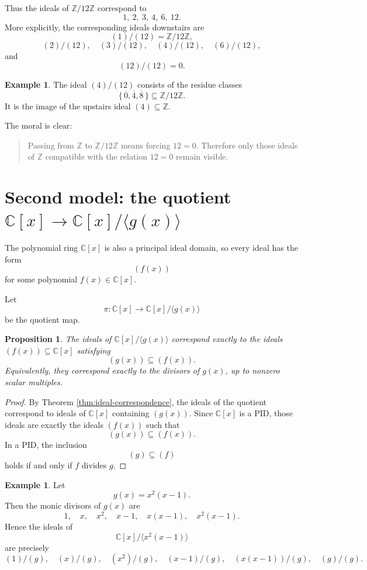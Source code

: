 \documentclass[11pt]{article}
\newtheorem{proposition}[theorem]{Proposition}
\theoremstyle{definition}
\newtheorem{example}[theorem]{Example}
\newcommand{\Z}{\mathbb{Z}}
\newcommand{\C}{\mathbb{C}}
\newcommand{\ideal}[1]{\langle #1\rangle}
\newcommand{\ol}[1]{\overline{#1}}
\begin{document}
	Thus the ideals of $\Z/12\Z$ correspond to
	\[
	1,\ 2,\ 3,\ 4,\ 6,\ 12.
	\]
	More explicitly, the corresponding ideals downstairs are
	\[
	(1)/(12)=\Z/12\Z,
	\]
	\[
	(2)/(12),\quad (3)/(12),\quad (4)/(12),\quad (6)/(12),
	\]
	and
	\[
	(12)/(12)=0.
	\]
	
	\begin{example}
		The ideal $(4)/(12)$ consists of the residue classes
		\[
		\{\,\ol{0},\ol{4},\ol{8}\,\}\subseteq \Z/12\Z.
		\]
		It is the image of the upstairs ideal $(4)\subseteq \Z$.
	\end{example}
	
	The moral is clear:
	
	\begin{quote}
		Passing from $\Z$ to $\Z/12\Z$ means forcing $12=0$.  
		Therefore only those ideals of $\Z$ compatible with the relation $12=0$ remain visible.
	\end{quote}
	
	\section{Second model: the quotient $\C[x]\to \C[x]/\ideal{g(x)}$}
	
	The polynomial ring $\C[x]$ is also a principal ideal domain, so every ideal has the form
	\[
	(f(x))
	\]
	for some polynomial $f(x)\in \C[x]$.
	
	Let
	\[
	\pi:\C[x]\longrightarrow \C[x]/\ideal{g(x)}
	\]
	be the quotient map.
	
	\begin{proposition}
		The ideals of $\C[x]/\ideal{g(x)}$ correspond exactly to the ideals $(f(x))\subseteq \C[x]$ satisfying
		\[
		(g(x))\subseteq (f(x)).
		\]
		Equivalently, they correspond exactly to the divisors of $g(x)$, up to nonzero scalar multiples.
	\end{proposition}
	
	\begin{proof}
		By Theorem \ref{thm:ideal-correspondence}, the ideals of the quotient correspond to ideals of $\C[x]$ containing $(g(x))$. Since $\C[x]$ is a PID, those ideals are exactly the ideals $(f(x))$ such that
		\[
		(g(x))\subseteq (f(x)).
		\]
		In a PID, the inclusion
		\[
		(g)\subseteq (f)
		\]
		holds if and only if $f$ divides $g$.
	\end{proof}
	
	\begin{example}
		Let
		\[
		g(x)=x^2(x-1).
		\]
		Then the monic divisors of $g(x)$ are
		\[
		1,\quad x,\quad x^2,\quad x-1,\quad x(x-1),\quad x^2(x-1).
		\]
		Hence the ideals of
		\[
		\C[x]/\ideal{x^2(x-1)}
		\]
		are precisely
		\[
		(1)/(g),\quad (x)/(g),\quad (x^2)/(g),\quad (x-1)/(g),\quad (x(x-1))/(g),\quad (g)/(g).
		\]
	\end{example}
	
\end{document}
